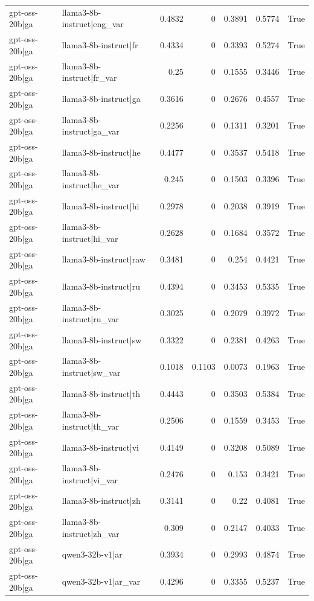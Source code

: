 \begin{table}
\begin{tabular}{l l r r r r l}
gpt-oss-20b|ga & llama3-8b-instruct|eng_var & 0.4832 & 0 & 0.3891 & 0.5774 & True \\
gpt-oss-20b|ga & llama3-8b-instruct|fr & 0.4334 & 0 & 0.3393 & 0.5274 & True \\
gpt-oss-20b|ga & llama3-8b-instruct|fr_var & 0.25 & 0 & 0.1555 & 0.3446 & True \\
gpt-oss-20b|ga & llama3-8b-instruct|ga & 0.3616 & 0 & 0.2676 & 0.4557 & True \\
gpt-oss-20b|ga & llama3-8b-instruct|ga_var & 0.2256 & 0 & 0.1311 & 0.3201 & True \\
gpt-oss-20b|ga & llama3-8b-instruct|he & 0.4477 & 0 & 0.3537 & 0.5418 & True \\
gpt-oss-20b|ga & llama3-8b-instruct|he_var & 0.245 & 0 & 0.1503 & 0.3396 & True \\
gpt-oss-20b|ga & llama3-8b-instruct|hi & 0.2978 & 0 & 0.2038 & 0.3919 & True \\
gpt-oss-20b|ga & llama3-8b-instruct|hi_var & 0.2628 & 0 & 0.1684 & 0.3572 & True \\
gpt-oss-20b|ga & llama3-8b-instruct|raw & 0.3481 & 0 & 0.254 & 0.4421 & True \\
gpt-oss-20b|ga & llama3-8b-instruct|ru & 0.4394 & 0 & 0.3453 & 0.5335 & True \\
gpt-oss-20b|ga & llama3-8b-instruct|ru_var & 0.3025 & 0 & 0.2079 & 0.3972 & True \\
gpt-oss-20b|ga & llama3-8b-instruct|sw & 0.3322 & 0 & 0.2381 & 0.4263 & True \\
gpt-oss-20b|ga & llama3-8b-instruct|sw_var & 0.1018 & 0.1103 & 0.0073 & 0.1963 & True \\
gpt-oss-20b|ga & llama3-8b-instruct|th & 0.4443 & 0 & 0.3503 & 0.5384 & True \\
gpt-oss-20b|ga & llama3-8b-instruct|th_var & 0.2506 & 0 & 0.1559 & 0.3453 & True \\
gpt-oss-20b|ga & llama3-8b-instruct|vi & 0.4149 & 0 & 0.3208 & 0.5089 & True \\
gpt-oss-20b|ga & llama3-8b-instruct|vi_var & 0.2476 & 0 & 0.153 & 0.3421 & True \\
gpt-oss-20b|ga & llama3-8b-instruct|zh & 0.3141 & 0 & 0.22 & 0.4081 & True \\
gpt-oss-20b|ga & llama3-8b-instruct|zh_var & 0.309 & 0 & 0.2147 & 0.4033 & True \\
gpt-oss-20b|ga & qwen3-32b-v1|ar & 0.3934 & 0 & 0.2993 & 0.4874 & True \\
gpt-oss-20b|ga & qwen3-32b-v1|ar_var & 0.4296 & 0 & 0.3355 & 0.5237 & True \\

\end{tabular}
\end{table}
